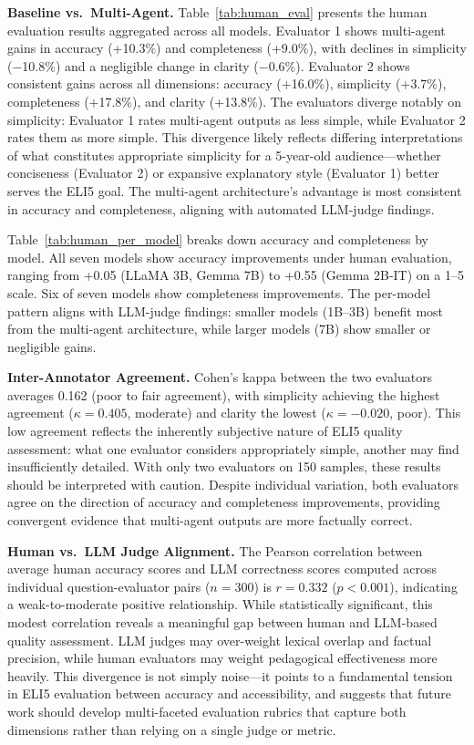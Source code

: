 \textbf{Baseline vs.\ Multi-Agent.} Table~\ref{tab:human_eval} presents the human evaluation results aggregated across all models. Evaluator 1 shows multi-agent gains in accuracy (+10.3\%) and completeness (+9.0\%), with declines in simplicity ($-$10.8\%) and a negligible change in clarity ($-$0.6\%). Evaluator 2 shows consistent gains across all dimensions: accuracy (+16.0\%), simplicity (+3.7\%), completeness (+17.8\%), and clarity (+13.8\%). The evaluators diverge notably on simplicity: Evaluator 1 rates multi-agent outputs as less simple, while Evaluator 2 rates them as more simple. This divergence likely reflects differing interpretations of what constitutes appropriate simplicity for a 5-year-old audience---whether conciseness (Evaluator 2) or expansive explanatory style (Evaluator 1) better serves the ELI5 goal. The multi-agent architecture's advantage is most consistent in accuracy and completeness, aligning with automated LLM-judge findings.

Table~\ref{tab:human_per_model} breaks down accuracy and completeness by model. All seven models show accuracy improvements under human evaluation, ranging from +0.05 (LLaMA 3B, Gemma 7B) to +0.55 (Gemma 2B-IT) on a 1--5 scale. Six of seven models show completeness improvements. The per-model pattern aligns with LLM-judge findings: smaller models (1B--3B) benefit most from the multi-agent architecture, while larger models (7B) show smaller or negligible gains.

\textbf{Inter-Annotator Agreement.} Cohen's kappa between the two evaluators averages 0.162 (poor to fair agreement), with simplicity achieving the highest agreement ($\kappa=0.405$, moderate) and clarity the lowest ($\kappa=-0.020$, poor). This low agreement reflects the inherently subjective nature of ELI5 quality assessment: what one evaluator considers appropriately simple, another may find insufficiently detailed. With only two evaluators on 150 samples, these results should be interpreted with caution. Despite individual variation, both evaluators agree on the direction of accuracy and completeness improvements, providing convergent evidence that multi-agent outputs are more factually correct.

\textbf{Human vs.\ LLM Judge Alignment.} The Pearson correlation between average human accuracy scores and LLM correctness scores computed across individual question-evaluator pairs ($n=300$) is $r=0.332$ ($p<0.001$), indicating a weak-to-moderate positive relationship. While statistically significant, this modest correlation reveals a meaningful gap between human and LLM-based quality assessment. LLM judges may over-weight lexical overlap and factual precision, while human evaluators may weight pedagogical effectiveness more heavily. This divergence is not simply noise---it points to a fundamental tension in ELI5 evaluation between accuracy and accessibility, and suggests that future work should develop multi-faceted evaluation rubrics that capture both dimensions rather than relying on a single judge or metric.

